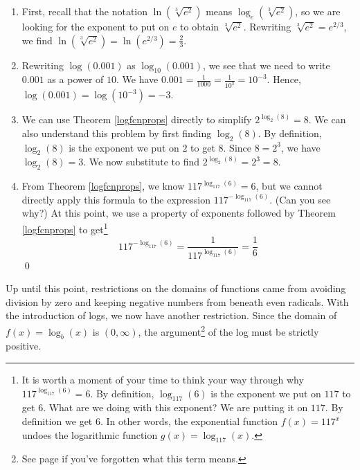 \begin{ex}
\begin{enumerate}
\item  First, recall that the notation  $\ln\left(\sqrt[3]{e^2}\right)$ means $\log_{e}\left(\sqrt[3]{e^2}\right)$, so we are looking for the exponent to put on $e$ to obtain $\sqrt[3]{e^2}$.  Rewriting $\sqrt[3]{e^2} = e^{2/3}$, we find  $\ln\left(\sqrt[3]{e^2}\right) =  \ln\left(e^{2/3}\right) = \frac{2}{3}$.

\item  Rewriting $\log(0.001)$ as $\log_{10} (0.001)$, we see that we need to write $0.001$ as a power of $10$.  We have $0.001 = \frac{1}{1000} = \frac{1}{10^3} = 10^{-3}$.  Hence, $\log(0.001) = \log\left(10^{-3}\right) = -3$.

\item  We can use Theorem \ref{logfcnprops} directly to simplify  $2^{\log_{2}(8)} = 8$. We can also understand this problem by first finding $\log_{2}(8)$.  By definition, $\log_{2}(8)$ is the exponent we put on $2$ to get $8$.  Since $8 = 2^3$, we have $\log_{2}(8) = 3$.  We now substitute to find $2^{\log_{2}(8)} = 2^3 = 8$.

\item  From Theorem \ref{logfcnprops}, we know $117^{\log_{117}(6)}=6$,  but we cannot directly apply this formula to the expression $117^{-\log_{117}(6)}$.  (Can you see why?) At this point, we use a property of exponents followed by Theorem \ref{logfcnprops} to get\footnote{It is worth a moment of your time to think your way through why $117^{\log_{117}(6)}=6$.  By definition, $\log_{117}(6)$ is the exponent we put on $117$ to get $6$.  What are we doing with this exponent?  We are putting it on $117$.  By definition we get $6$.  In other words, the exponential function $f(x) = 117^{x}$ undoes the logarithmic function $g(x) = \log_{117}(x)$.}
\enlargethispage{\baselineskip}   \[117^{-\log_{117}(6)} = \frac{1}{117^{\log_{117}(6)}} = \frac{1}{6}\]   \qed
 
\end{enumerate}

\end{ex}

Up until this point, restrictions on the domains of functions came from avoiding division by zero and keeping negative numbers from beneath even radicals.  With the introduction of logs, we now have another restriction.  Since the domain of $f(x) = \log_{b}(x)$ is $(0, \infty)$, the argument\footnote{See page \pageref{functionargument} if you've forgotten what this term means.} of the log must be strictly positive.  

